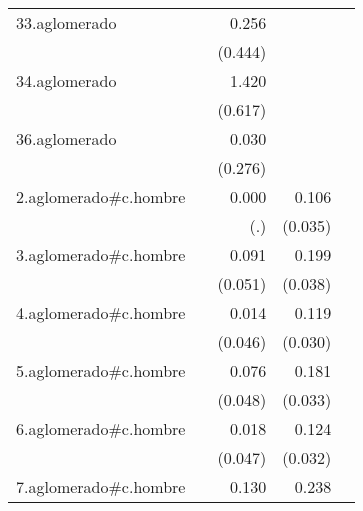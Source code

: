 {\begin{longtable}{l*{4}{D{.}{.}{-1}}}
\addlinespace
33.aglomerado&                     &       0.256         &                     &                     \\
            &                     &     (0.444)         &                     &                     \\
\addlinespace
34.aglomerado&                     &       1.420\sym{*}  &                     &                     \\
            &                     &     (0.617)         &                     &                     \\
\addlinespace
36.aglomerado&                     &       0.030         &                     &                     \\
            &                     &     (0.276)         &                     &                     \\
\addlinespace
2.aglomerado#c.hombre&                     &       0.000         &       0.106\sym{**} &                     \\
            &                     &         (.)         &     (0.035)         &                     \\
\addlinespace
3.aglomerado#c.hombre&                     &       0.091         &       0.199\sym{***}&                     \\
            &                     &     (0.051)         &     (0.038)         &                     \\
\addlinespace
4.aglomerado#c.hombre&                     &       0.014         &       0.119\sym{***}&                     \\
            &                     &     (0.046)         &     (0.030)         &                     \\
\addlinespace
5.aglomerado#c.hombre&                     &       0.076         &       0.181\sym{***}&                     \\
            &                     &     (0.048)         &     (0.033)         &                     \\
\addlinespace
6.aglomerado#c.hombre&                     &       0.018         &       0.124\sym{***}&                     \\
            &                     &     (0.047)         &     (0.032)         &                     \\
\addlinespace
7.aglomerado#c.hombre&                     &       0.130\sym{*}  &       0.238\sym{***}&                     \\

\end{longtable}}

